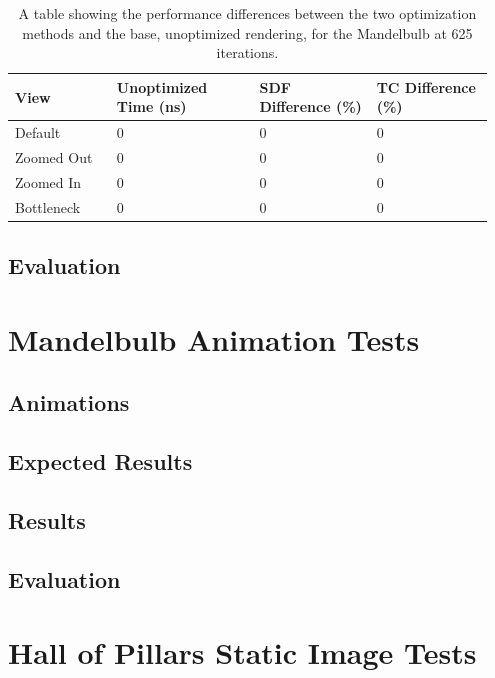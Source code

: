 \begin{table}[ht]
	\centering
	\begin{tabular}{||p{0.2\linewidth}|p{0.29\linewidth}|p{0.23\linewidth}|p{0.23\linewidth}||}
		\hline
		View & Unoptimized Time (ns) & SDF Difference (\%) & TC Difference (\%)\\
		\hline\hline
		Default & 0 & 0 & 0\\
		\hline
		Zoomed Out & 0 & 0 & 0\\
		\hline
		Zoomed In & 0 & 0 & 0\\
		\hline
		Bottleneck & 0 & 0 & 0\\
		\hline
	\end{tabular}
	\caption{A table showing the performance differences between the two optimization methods and the base, unoptimized rendering, for the Mandelbulb at 625 iterations.}
	\label{table:mandelbulb-4-iterations}
\end{table}

\subsection{Evaluation}

\section{Mandelbulb Animation Tests}

\subsection{Animations}

\subsection{Expected Results}

\subsection{Results}

\subsection{Evaluation}

\section{Hall of Pillars Static Image Tests}

